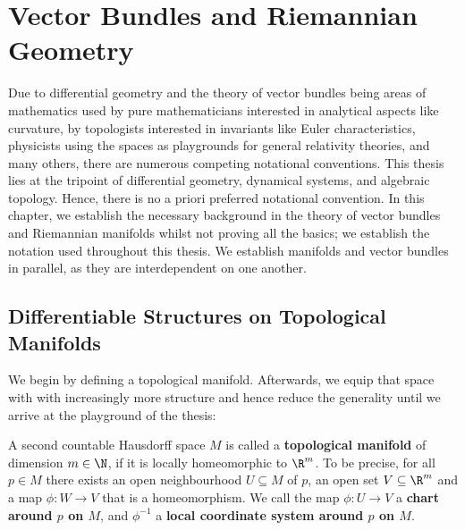 	\section{Vector Bundles and Riemannian Geometry}
\label{sec:background-geometry}
Due to differential geometry and the theory of vector bundles being areas of mathematics used by pure mathematicians interested in analytical aspects like curvature, by topologists interested in invariants like Euler characteristics, physicists using the spaces as playgrounds for general relativity theories, and many others, there are numerous competing notational conventions. This thesis lies at the tripoint of differential geometry, dynamical systems, and algebraic topology. Hence, there is no a priori preferred notational convention.
In this chapter, we establish the necessary background in the theory of vector bundles and Riemannian manifolds whilst not proving all the basics; we establish the notation used throughout this thesis. We establish manifolds and vector bundles in parallel, as they are interdependent on one another.
\subsection{Differentiable Structures on Topological Manifolds}
We begin by defining a topological manifold. Afterwards, we equip that space with with increasingly more structure and hence reduce the generality until we arrive at the playground of the thesis: 

\begin{definition} \label{def:vb-topologicalManifold}
	A second countable Hausdorff space $M$ is called a \textbf{topological manifold} of dimension $m\in \N$, if it is locally homeomorphic to $\R^m$. To be precise, for all $p\in M$ there exists an open neighbourhood $U\subseteq M$ of $p$, an open set $V\subseteq \R^m$  and a map $\phi:W\to V$ that is a homeomorphism. We call the map $\phi:U\to V$ a \textbf{chart around $p$ on $M$}, and $\phi^{-1}$ a \textbf{local coordinate system around $p$ on $M$}.
\end{definition}

